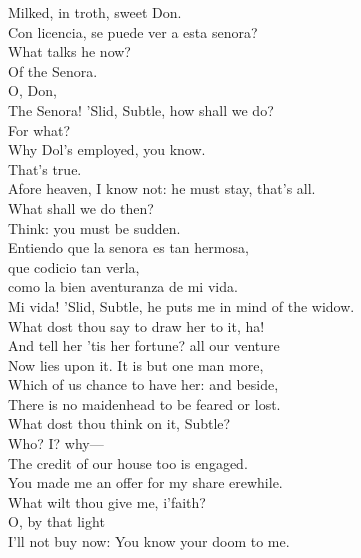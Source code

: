\documentclass[a4paper,oneside,12pt]{memoir}
\begin{document}
\begin{drama*}
\facespeaks {} Milked, in troth, sweet Don.\\
\surlyspeaks Con licencia, se puede ver a esta senora?\\
\subtlespeaks What talks he now?\\
\facespeaks {} Of the Senora.\\
\subtlespeaks {} O, Don,\\
The Senora!
\facespeaks {} 'Slid, Subtle, how shall we do?\\
\subtlespeaks For what?\\
\facespeaks {} Why Dol's employed, you know.\\
\subtlespeaks {} That's true.\\
Afore heaven, I know not: he must stay, that's all.\\
\subtlespeaks What shall we do then?\\
\facespeaks {} Think: you must be sudden.\\
\surlyspeaks Entiendo que la senora es tan hermosa,\\
que codicio tan verla,\\
como la bien aventuranza de mi vida.\\
\facespeaks Mi vida! 'Slid, Subtle, he puts me in mind of the widow.\\
What dost thou say to draw her to it, ha!\\
And tell her 'tis her fortune? all our venture\\
Now lies upon it. It is but one man more,\\
Which of us chance to have her: and beside,\\
There is no maidenhead to be feared or lost.\\
What dost thou think on it, Subtle?\\
\subtlespeaks {} Who? I? why---\\
\facespeaks The credit of our house too is engaged.\\
\subtlespeaks You made me an offer for my share erewhile.\\
What wilt thou give me, i'faith?\\
\facespeaks {} O, by that light\\
I'll not buy now: You know your doom to me.\\

\end{drama*}
\end{document}
